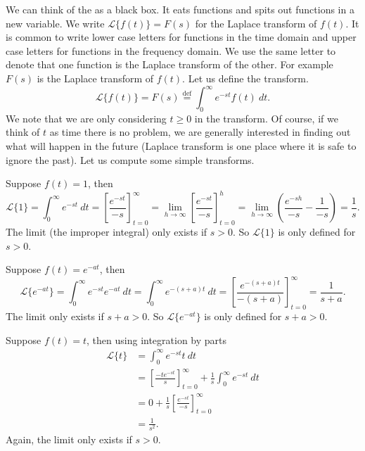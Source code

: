 We can think of the \emph{} as a black box.  It
eats functions and spits out functions in a new variable.  We write
$\mathcal{L} \bigl\{ f(t) \bigr\} = F(s)$ for the Laplace transform of $f(t)$.
It is common to write lower case letters for
functions in the time domain and upper case letters for functions in the
frequency domain.  We use the same letter to denote that one function
is the Laplace transform of the other.  For example $F(s)$ is the Laplace
transform of $f(t)$.  Let us define the transform.
\begin{equation*}
\mathcal{L} \bigl\{ f(t) \bigr\} =
F(s) \overset{\text{def}}{=} \int_0^\infty e^{-st} f(t) ~ dt .
\end{equation*}
We note that we are only considering $t \geq 0$ in the transform.  Of course,
if we think of $t$ as time there is no problem, we are generally interested in
finding out what will happen in the future (Laplace transform is one place
where it is safe to ignore the past).  Let us compute some simple
transforms.

\begin{example}
Suppose $f(t) = 1$, then
\begin{equation*}
\mathcal{L} \{1\} = \int_0^\infty e^{-st} ~ dt
=
\left[ \frac{e^{-st}}{-s} \right]_{t=0}^\infty
=
\lim_{h\to\infty}
\left[ \frac{e^{-st}}{-s} \right]_{t=0}^h
=
\lim_{h\to\infty}
\left( \frac{e^{-sh}}{-s} - \frac{1}{-s} \right)
= \frac{1}{s} .
\end{equation*}
The limit (the improper integral) only exists if $s > 0$.  So 
$\mathcal{L} \{1\}$ is only defined for $s > 0$.
\end{example}

\begin{example}
Suppose $f(t) = e^{-at}$, then
\begin{equation*}
\mathcal{L} \bigl\{e^{-at}\bigr\}
= \int_0^\infty e^{-st} e^{-at} ~ dt
= \int_0^\infty e^{-(s+a)t} ~ dt
=
\left[ \frac{e^{-(s+a)t}}{-(s+a)} \right]_{t=0}^\infty
= \frac{1}{s+a} .
\end{equation*}
The limit only exists if $s+a > 0$.  So 
$\mathcal{L} \bigl\{e^{-at}\bigr\}$ is only defined for $s+a > 0$.
\end{example}

\begin{example}
Suppose $f(t) = t$, then using integration by parts
\begin{equation*}
\begin{split}
\mathcal{L} \{t\}
& = \int_0^\infty e^{-st} t ~ dt \\
& =
\left[ \frac{-te^{-st}}{s} \right]_{t=0}^\infty
+
\frac{1}{s}
\int_0^\infty e^{-st} ~dt \\
& =
0
+
\frac{1}{s}
\left[ \frac{e^{-st}}{-s} \right]_{t=0}^\infty \\
& =
\frac{1}{s^2} .
\end{split}
\end{equation*}
Again, the limit only exists if $s > 0$.
\end{example}

